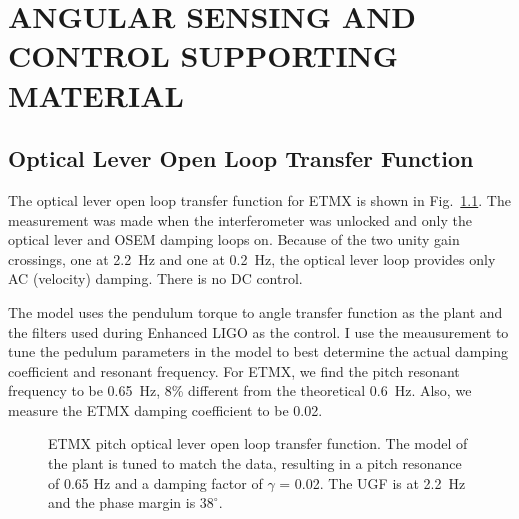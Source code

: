 \chapter{ANGULAR SENSING AND CONTROL SUPPORTING MATERIAL}



\section{Optical Lever Open Loop Transfer Function}
\label{sec:oplevOLG}
The optical lever open loop transfer function for ETMX is shown in
Fig.~\ref{fig:oplevOLG}. The measurement was made when the
interferometer was unlocked and only the optical lever and OSEM
damping loops on. Because of the two unity gain crossings, one at
2.2~Hz and one at 0.2~Hz, the optical lever loop provides only AC
(velocity) damping. There is no DC control. 

The model uses the pendulum torque to angle transfer function as the
plant and the filters used during Enhanced LIGO as the control. I use
the meausurement to tune the pedulum parameters in the model to best
determine the actual damping coefficient and resonant frequency. For
ETMX, we find the pitch resonant frequency to be 0.65~Hz, 8\%
different from the theoretical 0.6~Hz. Also, we measure the ETMX
damping coefficient to be 0.02.


\begin{figure}
\begin{centering}
\caption[Optical lever open loop transfer function]{ETMX pitch optical
  lever open loop transfer function. The model of the plant is tuned
  to match the data, resulting in a pitch resonance of 0.65 Hz and a
  damping factor of $\gamma$ = 0.02. The UGF is at 2.2~Hz and the
  phase margin is $38^\circ$.}
\label{fig:oplevOLG}
\end{centering}
\end{figure}





